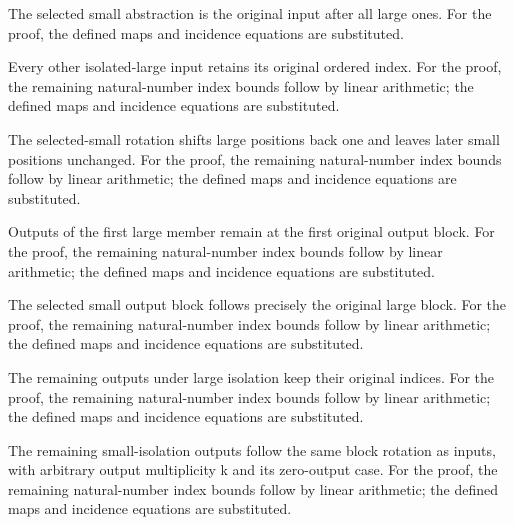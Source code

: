 The selected small abstraction is the original input after all large ones.
For the proof, the defined maps and incidence equations are substituted.
\par{}

Every other isolated-large input retains its original ordered index.
For the proof, the remaining natural-number index bounds follow by linear arithmetic; the defined maps and incidence equations are substituted.
\par{}

The selected-small rotation shifts large positions back one and leaves later small positions unchanged.
For the proof, the remaining natural-number index bounds follow by linear arithmetic; the defined maps and incidence equations are substituted.
\par{}

Outputs of the first large member remain at the first original output block.
For the proof, the remaining natural-number index bounds follow by linear arithmetic; the defined maps and incidence equations are substituted.
\par{}

The selected small output block follows precisely the original large block.
For the proof, the remaining natural-number index bounds follow by linear arithmetic; the defined maps and incidence equations are substituted.
\par{}

The remaining outputs under large isolation keep their original indices.
For the proof, the remaining natural-number index bounds follow by linear arithmetic; the defined maps and incidence equations are substituted.
\par{}

The remaining small-isolation outputs follow the same block rotation as inputs, with arbitrary output multiplicity k and its zero-output case.
For the proof, the remaining natural-number index bounds follow by linear arithmetic; the defined maps and incidence equations are substituted.
\par{}

